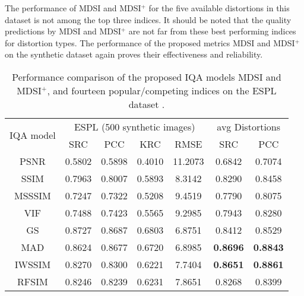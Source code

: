 The performance of MDSI and MDSI$^+$ for the five available distortions in this dataset is not among the top three indices. It should be noted that the quality predictions by MDSI and MDSI$^+$ are not far from these best performing indices for distortion types. The performance of the proposed metrics MDSI and MDSI$^+$ on the synthetic dataset again proves their effectiveness and reliability.  


\begin{table}[htb]
\caption{Performance comparison of the proposed IQA models MDSI and MDSI$^+$, and fourteen popular/competing indices on the ESPL dataset \cite{ESPL}.}
\scriptsize
\centering
\begin{tabular}{c|cccc|cc}
\hline
\multirow{2}{*}{IQA model} & \multicolumn{4}{c|}{ESPL (500 synthetic images)}                                & \multicolumn{2}{c}{avg Distortions}                 \\ \cline{2-7} 
                           & SRC             & PCC             & KRC             & RMSE            & SRC             & PCC             \\ \hline
PSNR                       & 0.5802          & 0.5898          & 0.4010          & 11.2073         & 0.6842          & 0.7074          \\
SSIM \cite{SSIM}                       & 0.7963          & 0.8007          & 0.5893          & 8.3142          & 0.8290          & 0.8458          \\
MSSSIM \cite{MSSSIM}                     & 0.7247          & 0.7322          & 0.5208          & 9.4519          & 0.7790          & 0.8075          \\
VIF \cite{VIF}                       & 0.7488          & 0.7423          & 0.5565          & 9.2985          & 0.7943          & 0.8280          \\
GS \cite{GS}                         & 0.8727          & 0.8687          & 0.6803          & 6.8751          & 0.8412          & 0.8529          \\
MAD \cite{MAD}                        & 0.8624          & 0.8677 & 0.6720          & 6.8985          & \textbf{0.8696} & \textbf{0.8843} \\
IWSSIM \cite{IWSSIM}                     & 0.8270          & 0.8300          & 0.6221          & 7.7404          & \textbf{0.8651} & \textbf{0.8861} \\
RFSIM \cite{RFSIM}                      & 0.8246          & 0.8239 & 0.6231          & 7.8651          & 0.8268          & 0.8399 \\

\end{tabular}
\end{table}
